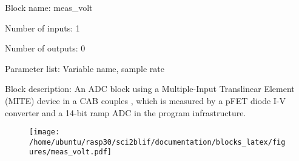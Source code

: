 \pagebreak

Block name: meas\_volt

Number of inputs: 1

Number of outputs: 0

Parameter list: Variable name, sample rate

Block description: 
An ADC block using a Multiple-Input Translinear Element (MITE) device in a CAB couples , which is measured by a pFET diode I-V converter and a 14-bit ramp ADC in the program infrastructure.

\begin{figure}[H]  %
\texttt{[image: /home/ubuntu/rasp30/sci2blif/documentation/blocks\_latex/figures/meas\_volt.pdf]}
\end{figure}

